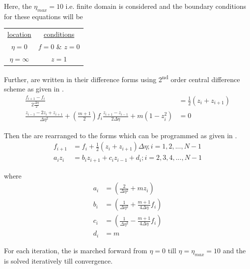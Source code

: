 \par Here, the \(\eta_{max} = 10\) i.e. finite domain is considered and the
boundary conditions for these equations will be
\begin{table}[!h]
    \centering
    \begin{tabular}{cc}
        \underline{location} & \underline{conditions} \\
        $\eta = 0$ & $f = 0$ \& $z = 0$ \\
        $\eta = \infty$ & $z = 1$
    \end{tabular}
\end{table}

\par Further,  are written in their difference forms using
2\textsuperscript{nd} order central difference scheme as given in
.
\begin{align}
    \frac{f_{i+1} - f_i}{2\frac{\Delta \eta}{2}} &= \frac{1}{2}\left(z_i + z_{i+1}\right) \label{diff_eqn1}\\
    \frac{z_{i-1} -2 z_i + z_{i+1}}{\Delta \eta^2} + \left(\frac{m+1}{2}\right)f_i \frac{z_{i+1} - z_{i-1}}{2 \Delta \eta} + m \left(1 - z_i^2\right) &= 0 \label{diff_eqn2}
\end{align}

\par Then the  are rearranged to the forms which can be
programmed as given in .
\begin{align}
    f_{i+1} &= f_i + \frac{1}{2}\left(z_i + z_{i+1}\right)\Delta\eta; i = 1,2,...,N-1 \label{alg_eqn1} \\
    a_i z_i &= b_i z_{i+1} + c_i z_{i-1} + d_i; i = 2,3,4,...,N-1 \label{alg_eqn2}
\end{align}

where
\begin{align*}
    a_i &= \left(\frac{2}{\Delta\eta^2} + m z_i\right) \\
    b_i &= \left(\frac{1}{\Delta\eta^2} + \frac{m+1}{4 \Delta \eta}f_i\right) \\
    c_i &= \left(\frac{1}{\Delta\eta^2} - \frac{m+1}{4 \Delta \eta}f_i\right) \\
    d_i &= m
\end{align*}

\par For each iteration, the  is marched forward from \(\eta = 0\)
till \(\eta = \eta_{max} = 10\) and the  is solved iteratively
till convergence.\\

